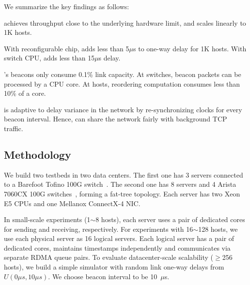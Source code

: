 We summarize the key findings as follows:


\sys achieves throughput close to the underlying hardware limit, and scales linearly to 1K hosts.

With reconfigurable chip, \sys adds less than 5$\mu$s to one-way delay for 1K hosts. With switch CPU, \sys adds less than 15$\mu$s delay.

\sys's beacons only consume 0.1\% link capacity. At switches, beacon packets can be processed by a CPU core. At hosts, reordering computation consumes less than 10\% of a core.

\sys is adaptive to delay variance in the network by re-synchronizing clocks for every beacon interval. Hence, \sys can share the network fairly with background TCP traffic.

\subsection{Methodology}
\label{sec:testbed}

We build two testbeds in two data centers.
The first one has 3 servers connected to a Barefoot Tofino 100G switch~\cite{tofino}.
The second one has 8 servers and 4 Arista 7060CX 100G switches~\cite{arista}, forming a fat-tree topology.
Each server has two Xeon E5 CPUs and one Mellanox ConnectX-4 NIC. %


In small-scale experiments (1$\sim$8 hosts), each server uses a pair of dedicated cores for sending and receiving, respectively.
For experiments with 16$\sim$128 hosts, we use each physical server as 16 logical servers. Each logical server has a pair of dedicated cores, maintains timestamps independently and communicates via separate RDMA queue pairs.
To evaluate datacenter-scale scalability ($\ge$256 hosts), we build a simple simulator with random link one-way delays from $U(0\mu s,10\mu s)$.
We choose beacon interval to be 10~$\mu$s.


